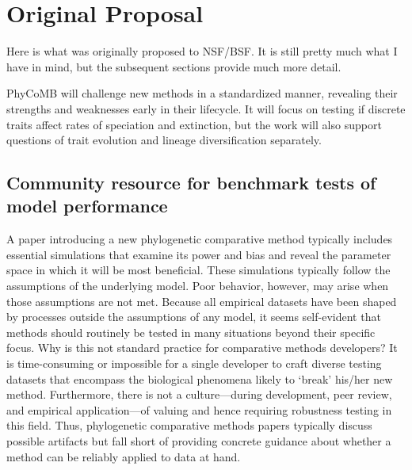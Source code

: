 \section{Original Proposal}

Here is what was originally proposed to NSF/BSF.
It is still pretty much what I have in mind, but the subsequent sections provide much more detail.

\bigskip

PhyCoMB will challenge new methods in a standardized manner, revealing their strengths and weaknesses early in their lifecycle.
It will focus on testing if discrete traits affect rates of speciation and extinction, but the work will also support questions of trait evolution and lineage diversification separately.

\subsection{Community resource for benchmark tests of model performance}
\label{sec:proposal}

A paper introducing a new phylogenetic comparative method typically includes 
essential simulations that examine its power and bias and reveal the parameter space in which it will be most beneficial.
These simulations typically follow the assumptions of the underlying model.
Poor behavior, however, may arise when those assumptions are not met.
Because all empirical datasets have been shaped by processes outside the assumptions of any model, it seems self-evident that methods should routinely be tested in many situations beyond their specific focus.
Why is this not standard practice for comparative methods developers?
It is time-consuming or impossible for a single developer to craft diverse testing datasets that encompass the biological phenomena likely to `break' his/her new method.
Furthermore, there is not a culture---during development, peer review, and empirical application---of valuing and hence requiring robustness testing in this field.
Thus, phylogenetic comparative methods papers typically discuss possible artifacts but fall short of providing concrete guidance about whether a method can be reliably applied to data at hand. 

